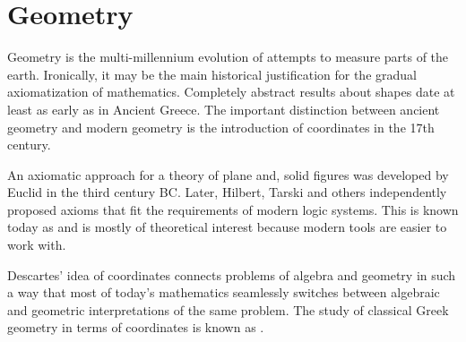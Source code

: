 \section{Geometry}\label{sec:geometry}

Geometry is the multi-millennium evolution of attempts to measure parts of the earth. Ironically, it may be the main historical justification for the gradual axiomatization of mathematics. Completely abstract results about shapes date at least as early as in Ancient Greece. The important distinction between ancient geometry and modern geometry is the introduction of coordinates in the 17th century.

An axiomatic approach for a theory of plane and, solid figures was developed by Euclid in the third century BC. Later, Hilbert, Tarski and others independently proposed axioms that fit the requirements of modern logic systems. This is known today as  and is mostly of theoretical interest because modern tools are easier to work with.

Descartes' idea of coordinates connects problems of algebra and geometry in such a way that most of today's mathematics seamlessly switches between algebraic and geometric interpretations of the same problem. The study of classical Greek geometry in terms of coordinates is known as .
